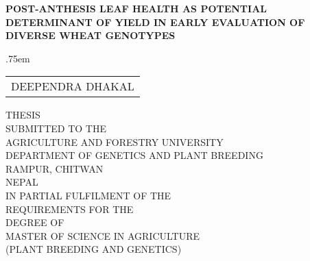 
{\pagestyle{empty}
  \fontsize{12}{14}\selectfont
  \begin{titlepage}
  \newpage
  \let\footnotesize\small
  \let\footnoterule\relax
  \let \footnote \thanks

  \begin{center}
    \setcounter{page}{1}
    \null
    {\fontsize{12}{14}\selectfont \textbf{POST-ANTHESIS LEAF HEALTH AS POTENTIAL DETERMINANT OF YIELD IN EARLY EVALUATION OF DIVERSE WHEAT GENOTYPES}}
    \vspace{8\baselineskip}
    \centerline{}
	{\fontsize{12}{14}\selectfont \lineskip .75em
    \begin{tabular}[t]{c}%
      DEEPENDRA DHAKAL
    \end{tabular}\par}
	\vspace{3\baselineskip}
    THESIS \\
    SUBMITTED TO THE \\
    AGRICULTURE AND FORESTRY UNIVERSITY \\
    DEPARTMENT OF GENETICS AND PLANT BREEDING \\
    RAMPUR, CHITWAN \\
    NEPAL \\
	\vspace{3\baselineskip}
	  IN PARTIAL FULFILMENT OF THE \\
	  REQUIREMENTS FOR THE \\
	  DEGREE OF \\
	\vspace{3\baselineskip}
	  MASTER OF SCIENCE IN AGRICULTURE \\
	  (PLANT BREEDING AND GENETICS) \\
    \centerline{}
    {\fontsize{12}{14} \par}
  \end{center}\par
  \end{titlepage}
}

